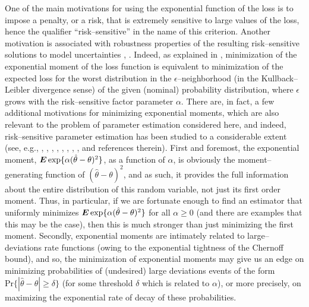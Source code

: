 \documentclass[11pt,epsf]{article}
\newcommand{\ct}{\hat{\theta}}
\newcommand {\bE} {\mbox{\boldmath $E$}}
\begin{document}
One of the main motivations for using the
exponential function of the loss is to
impose a penalty, or a risk, that is extremely sensitive to large
values of the loss, hence the qualifier ``risk--sensitive'' in the name
of this criterion. 
Another motivation is associated with robustness properties of the
resulting risk--sensitive solutions to model uncertainties \cite{ACD15}, \cite{DJP00}.
Indeed, as explained in \cite[p.\ 349, the paragraph of eq.\
(11)]{p143}, minimization of the exponential moment of the loss function is
equivalent to minimization of the expected loss for the worst distribution in
the $\epsilon$--neighborhood (in the Kullback--Leibler divergence sense) 
of the given (nominal) probability distribution, where $\epsilon$ grows with
the risk--sensitive factor parameter $\alpha$.
There are, in fact, a few additional motivations for
minimizing exponential moments, which are also
relevant to the problem of parameter estimation considered here, and indeed,
risk--sensitive parameter estimation has been studied to a considerable
extent (see, e.g., \cite{BS98}, \cite{Ford99}, \cite{HP13}, \cite{JBE94}, \cite{MED97},
\cite{RSS14}, \cite{RM02}, \cite{YB09},
and references therein).
First and foremost,
the exponential moment, $\bE\exp\{\alpha(\ct-\theta)^2\}$, as a function of
$\alpha$, is obviously the
moment--generating function of $(\ct-\theta)^2$, and as such, it provides the full
information about the entire distribution of this random variable, not just
its first
order moment. 
Thus, in particular, if we are fortunate enough to find
an estimator that
uniformly minimizes $\bE
\exp\{\alpha(\ct-\theta)^2\}$ for all $\alpha \ge 0$ (and there are examples
that this may be the case), then this is much stronger
than just minimizing the
first moment.
Secondly, exponential moments are intimately related to
large--deviations rate functions (owing to the exponential tightness of the
Chernoff bound), and so, the minimization of exponential
moments may give us an edge on minimizing probabilities of (undesired) large
deviations events of the form $\mbox{Pr}\{|\ct-\theta| \ge \delta\}$ (for some threshold
$\delta$ which is related to $\alpha$), or more precisely,
on maximizing the exponential rate of decay of these probabilities. 
\end{document}
